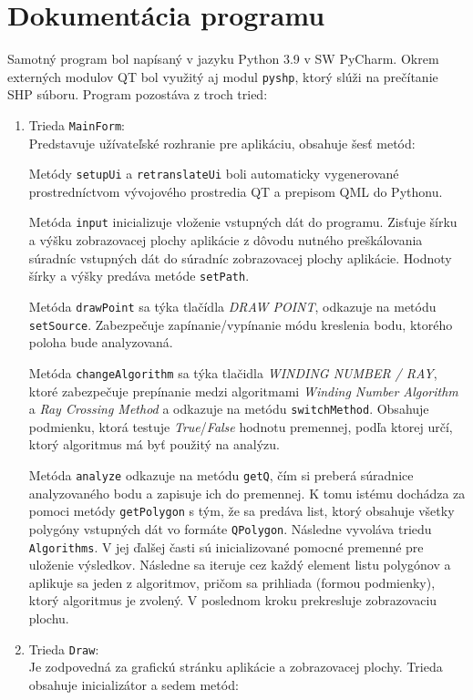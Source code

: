 \documentclass[11pt]{article}
\begin{document}
\newpage
\section{Dokumentácia programu}
Samotný program bol napísaný v jazyku Python 3.9 v SW PyCharm. Okrem externých modulov QT bol využitý aj modul \texttt{pyshp}, ktorý slúži na prečítanie SHP súboru. Program pozostáva z troch tried:
\begin{enumerate}
    \item  Trieda \texttt{MainForm}:\\
Predstavuje užívateľské rozhranie pre aplikáciu, obsahuje šesť metód:

Metódy \texttt{setupUi} a \texttt{retranslateUi} boli automaticky vygenerované prostredníctvom vývojového prostredia QT a prepisom QML do Pythonu.

Metóda \texttt{input} inicializuje vloženie vstupných dát do programu. Zisťuje šírku a výšku zobrazovacej plochy aplikácie z dôvodu nutného preškálovania súradníc vstupných dát do súradníc zobrazovacej plochy aplikácie. Hodnoty šírky a výšky predáva metóde \texttt{setPath}.

Metóda \texttt{drawPoint} sa týka tlačídla \textit{DRAW POINT}, odkazuje na metódu \texttt{setSource}. Zabezpečuje zapínanie/vypínanie módu kreslenia bodu, ktorého poloha bude analyzovaná.

Metóda \texttt{changeAlgorithm} sa týka tlačidla \textit{WINDING NUMBER / RAY}, ktoré zabezpečuje prepínanie medzi algoritmami \textit{Winding Number Algorithm} a \textit{Ray Crossing Method} a odkazuje na metódu \texttt{switchMethod}. Obsahuje podmienku, ktorá testuje \textit{True}/\textit{False} hodnotu premennej, podľa ktorej určí, ktorý algoritmus má byť použitý na analýzu.

Metóda \texttt{analyze} odkazuje na metódu \texttt{getQ}, čím si preberá súradnice analyzovaného bodu a zapisuje ich do premennej. K tomu istému dochádza za pomoci metódy \texttt{getPolygon} s tým, že sa predáva list, ktorý obsahuje všetky polygóny vstupných dát vo formáte \texttt{QPolygon}. Následne vyvoláva triedu \texttt{Algorithms}.\newline
V jej ďalšej časti sú inicializované pomocné premenné pre uloženie výsledkov.\newline
Následne sa iteruje cez každý element listu polygónov a aplikuje sa jeden z algoritmov, pričom sa prihliada (formou podmienky), ktorý algoritmus je zvolený. V poslednom kroku prekresluje zobrazovaciu plochu.
    \item Trieda \texttt{Draw}:\\
Je zodpovedná za grafickú stránku aplikácie a zobrazovacej plochy. Trieda obsahuje inicializátor a sedem metód:


\end{enumerate}
\end{document}
